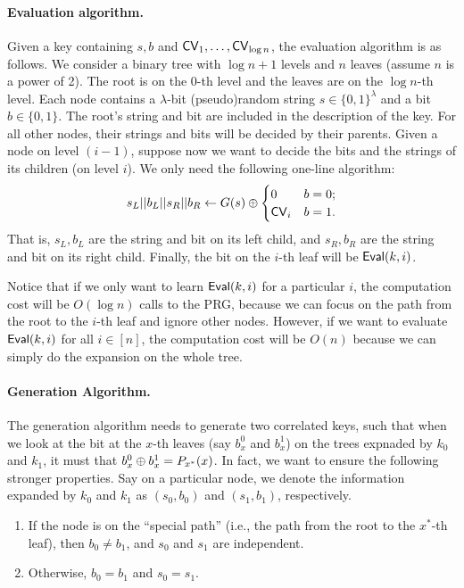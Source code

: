 \paragraph{Evaluation algorithm.} 
Given a key containing $s,b$ and ${\sf CV}_1,\dots,{\sf CV}_{\log n}$, the evaluation algorithm is as follows.
We consider a binary tree with $\log n + 1$ levels and $n$ leaves (assume $n$ is a power of 2). 
The root is on the $0$-th level and the leaves are on the $\log n$-th level.
Each node contains a $\lambda$-bit (pseudo)random string $ s \in \{0,1\}^{\lambda}$ and a bit $b \in \{0,1\}$. 
The root's string and bit are included in the description of the key.
For all other nodes, their strings and bits will be decided by their parents.
Given a node on level $(i-1)$, suppose now we want to decide the bits and the strings of its children (on level $i$). 
We only need the following one-line algorithm:
 $$ s_{L} || b_{L} || s_{R} || b_{R} \leftarrow G(s) \oplus
 \begin{cases} 
    0 & b = 0; \\
    {\sf CV}_i & b = 1. \\
 \end{cases}$$
That is, $s_{L}, b_{L}$ are the string and bit on its left child, and $s_{R}, b_{R}$ are the string and bit on its right child.
Finally, the bit on the $i$-th leaf will be ${\sf Eval}(k, i)$.

Notice that if we only want to learn ${\sf Eval}(k, i)$ for a particular $i$, the computation cost will be $O(\log n)$ calls to the PRG, because we can focus on the path from the root to the $i$-th leaf and ignore other nodes.
However, if we want to evaluate ${\sf Eval}(k, i)$ for all $i\in[n]$, the computation cost will be $O(n)$ because we can simply do the expansion on the whole tree. 


\paragraph{Generation Algorithm.} The generation algorithm needs to generate two correlated keys, such that when we look at the bit at the $x$-th leaves (say $b^0_{x}$ and $b^1_{x}$) on the trees expnaded by $k_0$ and $k_1$, it must that $b^0_{x}\oplus b^1_{x}=P_{x^*}(x)$. In fact, we want to ensure the following stronger properties.
Say on a particular node, we denote the information expanded by $k_0$ and $k_1$ as $(s_0,b_0)$ and $(s_1,b_1)$, respectively.
\begin{enumerate}
    \item If the node is on the ``special path'' (i.e., the path from the root to the $x^*$-th leaf), then $b_0\ne b_1$, and $s_0$ and $s_1$ are independent.
    
    \item Otherwise, $b_0=b_1$ and $s_0=s_1$.
\end{enumerate}

